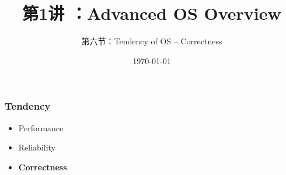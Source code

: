 


\title[第1讲]{第1讲 ：Advanced OS Overview} %
\subtitle{第六节：Tendency of OS -- Correctness}
\date{\today} %
\date{} 



\begin{frame}
\titlepage %
\end{frame}

%
%
\begin{frame}
	\frametitle{Tendency}

	\begin{itemize}\huge
	\item Performance
	\item Reliability
	\item \textbf{Correctness}
	
\end{itemize}
\end{frame}


